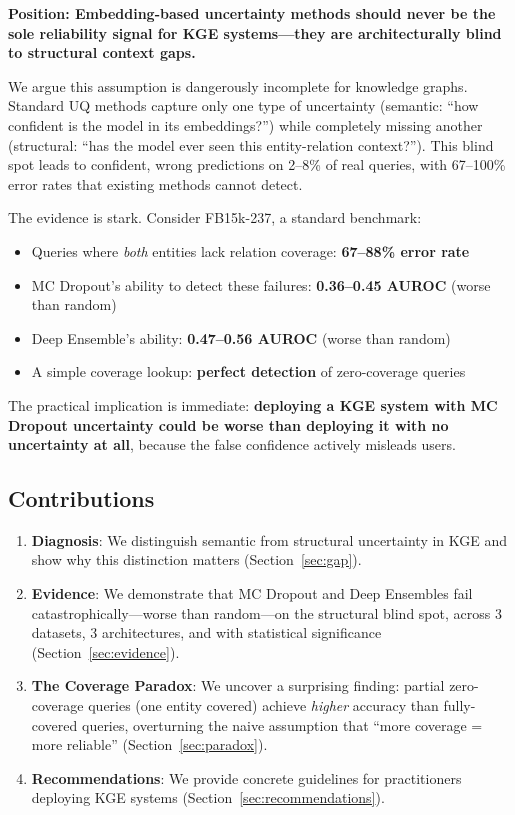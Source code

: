 \documentclass{article}
\begin{document}
\textbf{Position: Embedding-based uncertainty methods should never be the sole reliability signal for KGE systems---they are architecturally blind to structural context gaps.}

We argue this assumption is dangerously incomplete for knowledge graphs. Standard UQ methods capture only one type of uncertainty (semantic: ``how confident is the model in its embeddings?'') while completely missing another (structural: ``has the model ever seen this entity-relation context?''). This blind spot leads to confident, wrong predictions on 2--8\% of real queries, with 67--100\% error rates that existing methods cannot detect.

The evidence is stark. Consider FB15k-237, a standard benchmark:
\begin{itemize}
    \item Queries where \emph{both} entities lack relation coverage: \textbf{67--88\% error rate}
    \item MC Dropout's ability to detect these failures: \textbf{0.36--0.45 AUROC} (worse than random)
    \item Deep Ensemble's ability: \textbf{0.47--0.56 AUROC} (worse than random)
    \item A simple coverage lookup: \textbf{perfect detection} of zero-coverage queries
\end{itemize}

The practical implication is immediate: \textbf{deploying a KGE system with MC Dropout uncertainty could be worse than deploying it with no uncertainty at all}, because the false confidence actively misleads users.

\subsection{Contributions}

\begin{enumerate}
    \item \textbf{Diagnosis}: We distinguish semantic from structural uncertainty in KGE and show why this distinction matters (Section~\ref{sec:gap}).

    \item \textbf{Evidence}: We demonstrate that MC Dropout and Deep Ensembles fail catastrophically---worse than random---on the structural blind spot, across 3 datasets, 3 architectures, and with statistical significance (Section~\ref{sec:evidence}).

    \item \textbf{The Coverage Paradox}: We uncover a surprising finding: partial zero-coverage queries (one entity covered) achieve \emph{higher} accuracy than fully-covered queries, overturning the naive assumption that ``more coverage = more reliable'' (Section~\ref{sec:paradox}).

    \item \textbf{Recommendations}: We provide concrete guidelines for practitioners deploying KGE systems (Section~\ref{sec:recommendations}).
\end{enumerate}
\end{document}
